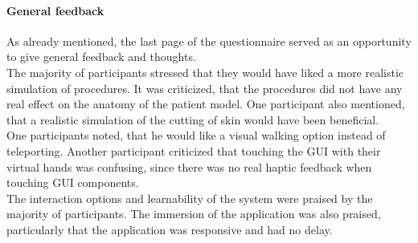 \paragraph{General feedback}
As already mentioned, the last page of the questionnaire served as 
an opportunity to give general feedback and thoughts.
\\ The majority of participants stressed that they would have liked
a more realistic simulation of procedures. It was criticized,
that the procedures did not have any real effect on the anatomy
of the patient model. One participant also mentioned,
that a realistic simulation of the cutting of skin would have
been beneficial. 
\\ One participants noted, that he would like
a visual walking option instead of teleporting. Another participant
criticized that touching the GUI with their virtual hands 
was confusing, since there was no real haptic feedback when 
touching GUI components. 
\\ The interaction options 
and learnability of the system were praised by the majority of 
participants. The immersion of the application was also praised,
particularly that the application was responsive and had no 
delay.